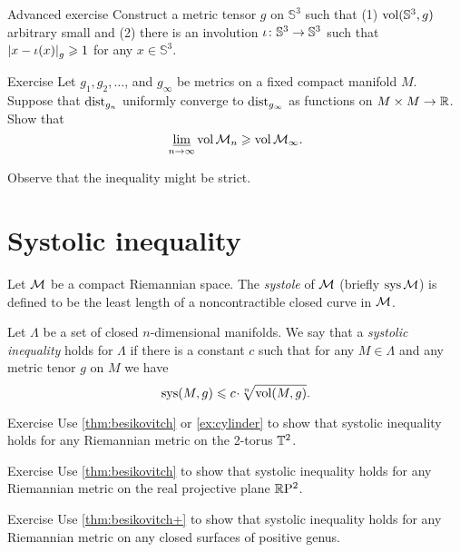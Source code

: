 \begin{thm}{Advanced exercise}\label{ex:involution-of-3sphere}
Construct a metric tensor $g$ on $\mathbb{S}^3$ such that (1) $\operatorname{\rm vol}\nolimits(\mathbb{S}^3,g)$ arbitrary small and (2) there is an involution $\iota\:\mathbb{S}^3\z\to \mathbb{S}^3$ such that $\dist{x}{\iota(x)}{g}\ge 1$ for any $x\in \mathbb{S}^3$.
\end{thm}

\begin{thm}{Exercise}\label{ex:GH-vol}
Let $g_1,g_2,\dots$, and $g_\infty$ be metrics on a fixed compact manifold $M$.
Suppose that $\mathrm{dist}_{g_n}$ uniformly converge to $\mathrm{dist}_{g_\infty}$ as functions on $M\times M\to\mathbb{R}$.
Show that 
\[\varliminf_{n\to\infty}\operatorname{\rm vol}\nolimits\mathcal{M}_n\geqslant \operatorname{\rm vol}\nolimits\mathcal{M}_\infty.\]

Observe that the inequality might be strict.
\end{thm}

\section{Systolic inequality}

Let $\mathcal{M}$ be a compact Riemannian space.
The \emph{systole} of $\mathcal{M}$ (briefly $\mathop{\rm sys}\nolimits\mathcal{M}$) is defined to be the least length of a noncontractible closed curve in $\mathcal{M}$.

Let $\Lambda$ be a set of closed $n$-dimensional manifolds.
We say that a \emph{systolic inequality} holds for $\Lambda$ if there is a constant $c$ such that for any $M\in \Lambda$ and any metric tenor $g$ on $M$ we have
\[\sys(M,g)\le c\cdot \sqrt[n]{\vol(M,g)}.\]

\begin{thm}{Exercise}\label{ex:sysT2}
Use \ref{thm:besikovitch} or \ref{ex:cylinder} to show that systolic inequality holds for any Riemannian metric on the 2-torus $\mathbb{T}^2$.
\end{thm}

\begin{thm}{Exercise}\label{ex:sysRP2}
Use \ref{thm:besikovitch} to show that systolic inequality holds for any Riemannian metric on  the real projective plane $\mathbb{R}\mathrm{P}^2$.
\end{thm}

\begin{thm}{Exercise}\label{ex:sysSg}
Use \ref{thm:besikovitch+} to show that systolic inequality holds for any Riemannian metric on any closed surfaces of positive genus.
\end{thm}

